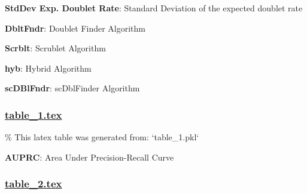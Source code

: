\documentclass[11pt]{article}
\begin{document}
\begin{codeoutput}
\begin{table}[h]
\begin{threeparttable}
\begin{tablenotes}
\item \textbf{StdDev Exp. Doublet Rate}: Standard Deviation of the expected doublet rate
\item \textbf{DbltFndr}: Doublet Finder Algorithm
\item \textbf{Scrblt}: Scrublet Algorithm
\item \textbf{hyb}: Hybrid Algorithm
\item \textbf{scDBlFndr}: scDblFinder Algorithm
\end{tablenotes}
\end{threeparttable}
\end{table}
\end{codeoutput}

\subsubsection*{\hyperlink{code-LaTeX Table Design-table-1-tex}{table\_1.tex}}

\begin{codeoutput}
\% This latex table was generated from: `table\_1.pkl`
\begin{table}[h]
\caption{ANOVA results comparing Area Under Precision-Recall Curve (AUPRC) across algorithms}
\label{table:table\_1}
\begin{threeparttable}
\renewcommand{\TPTminimum}{\linewidth}
\begin{tablenotes}
\footnotesize
\item \textbf{AUPRC}: Area Under Precision-Recall Curve
\end{tablenotes}
\end{threeparttable}
\end{table}
\end{codeoutput}

\subsubsection*{\hyperlink{code-LaTeX Table Design-table-2-tex}{table\_2.tex}}
\end{document}
